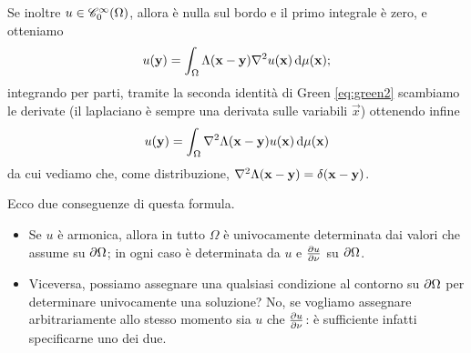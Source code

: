 Se inoltre $u\in\contsc[\infty]{\Omega}$, allora è nulla sul bordo e il primo integrale è zero, e otteniamo
\begin{equation}
    u(\vec y)=\int_\Omega \sfl(\vec x-\vec y)\lap u(\vec x)\,\dd\mu(\vec x);
\end{equation}
integrando per parti, tramite la seconda identità di Green \eqref{eq:green2} scambiamo le derivate (il laplaciano è sempre una derivata sulle variabili $\vec x$) ottenendo infine
\begin{equation}
    u(\vec y)=\int_\Omega \lap\sfl(\vec x-\vec y)u(\vec x)\,\dd\mu(\vec x)
    \label{eq:laplace-delta}
\end{equation}
da cui vediamo che, come distribuzione, $\lap\sfl(\vec x-\vec y)=\delta(\vec x-\vec y)$.

Ecco due conseguenze di questa formula.
\begin{itemize}
    \item Se $u$ è armonica, allora in tutto $\Omega$ è univocamente determinata dai valori che assume su $\boundary\Omega$; in ogni caso è determinata da $u$ e $\drp{u}{\nu}$ su $\boundary\Omega$. %
    \item Viceversa, possiamo assegnare una qualsiasi condizione al contorno su $\boundary\Omega$ per determinare univocamente una soluzione?
        No, se vogliamo assegnare arbitrariamente allo stesso momento sia $u$ che $\drp{u}{\nu}$: è sufficiente infatti specificarne uno dei due.
\end{itemize}


